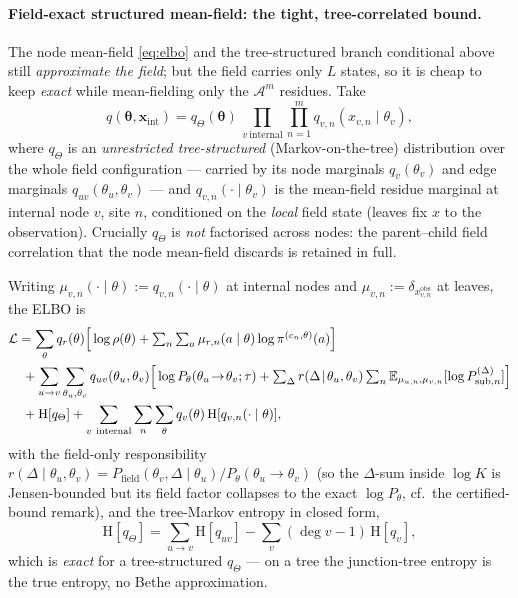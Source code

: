 \paragraph{Field-exact structured mean-field: the tight, tree-correlated
bound.} The node mean-field \eqref{eq:elbo} and the tree-structured branch
conditional above still \emph{approximate the field}; but the field carries
only $L$ states, so it is cheap to keep \emph{exact} while mean-fielding only
the $\mathcal{A}^m$ residues. Take
\begin{equation}
  q(\boldsymbol{\theta},\mathbf{x}_{\mathrm{int}})
    = q_\Theta(\boldsymbol{\theta})\,
      \prod_{v\ \mathrm{internal}}\prod_{n=1}^{m}
        q_{v,n}(x_{v,n}\mid\theta_v),
  \label{eq:field-exact-family}
\end{equation}
where $q_\Theta$ is an \emph{unrestricted tree-structured}
(Markov-on-the-tree) distribution over the whole field configuration ---
carried by its node marginals $q_v(\theta_v)$ and edge marginals
$q_{uv}(\theta_u,\theta_v)$ --- and $q_{v,n}(\cdot\mid\theta_v)$ is the
mean-field residue marginal at internal node $v$, site $n$, conditioned on the
\emph{local} field state (leaves fix $x$ to the observation). Crucially
$q_\Theta$ is \emph{not} factorised across nodes: the parent--child field
correlation that the node mean-field discards is retained in full.

Writing $\mu_{v,n}(\cdot\mid\theta):=q_{v,n}(\cdot\mid\theta)$ at internal
nodes and $\mu_{v,n}:=\delta_{x^{\mathrm{obs}}_{v,n}}$ at leaves, the ELBO is
\begin{align}
  \mathcal{L}
    &= \sum_{\theta} q_r(\theta)\Big[\log\rho(\theta)
         + \textstyle\sum_n \sum_a \mu_{r,n}(a\mid\theta)\log\pi^{(c_n,\theta)}(a)\Big]
       \nonumber\\
    &\ + \sum_{u\to v}\sum_{\theta_u,\theta_v} q_{uv}(\theta_u,\theta_v)
         \Big[\log P_\theta(\theta_u\!\to\!\theta_v;\tau)
         + \textstyle\sum_{\Delta} r(\Delta\!\mid\!\theta_u,\theta_v)
             \sum_n \mathbb{E}_{\mu_{u,n},\mu_{v,n}}
                    [\log P^{(\Delta)}_{\mathrm{sub},n}]\Big]
       \nonumber\\
    &\ + \mathrm{H}[q_\Theta]
       + \sum_{v\ \mathrm{internal}}\sum_n\sum_{\theta} q_v(\theta)\,
             \mathrm{H}[q_{v,n}(\cdot\mid\theta)],
  \label{eq:field-exact-elbo}
\end{align}
with the field-only responsibility
$r(\Delta\!\mid\!\theta_u,\theta_v)
= P_{\mathrm{field}}(\theta_v,\Delta\mid\theta_u)/P_\theta(\theta_u\!\to\!\theta_v)$
(so the $\Delta$-sum inside $\log K$ is Jensen-bounded but its field factor
collapses to the exact $\log P_\theta$, cf.\ the certified-bound remark), and
the tree-Markov entropy in closed form,
\begin{equation}
  \mathrm{H}[q_\Theta] = \sum_{u\to v}\mathrm{H}[q_{uv}]
      - \sum_v (\deg v - 1)\,\mathrm{H}[q_v],
  \label{eq:field-tree-entropy}
\end{equation}
which is \emph{exact} for a tree-structured $q_\Theta$ --- on a tree the
junction-tree entropy is the true entropy, no Bethe approximation.

